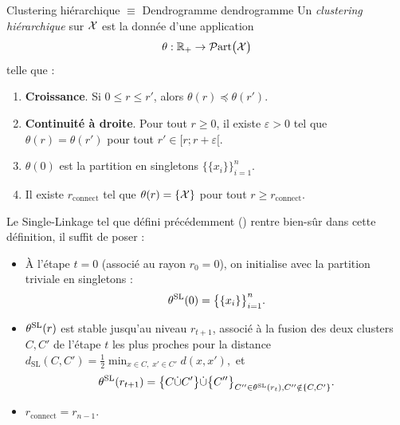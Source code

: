 \begin{Definition}{Clustering hiérarchique $\equiv$ Dendrogramme \cite{CarlssonMemoli2010}}{dendrogramme}
Un \emph{clustering hiérarchique} sur $\mathcal{X}$ est la donnée d'une application
$$\theta : \mathbb{R}_{+} \to \mathcal{P}\mathrm{art}\bigl( \mathcal{X} \bigr)$$
telle que :
\begin{enumerate}[label=(\roman*)]
    \item \textbf{Croissance}. Si $0\le r\le r'$, alors $\theta(r)\preceq \theta(r')$.
    \item \textbf{Continuité à droite}. Pour tout $r\ge0$, il existe $\varepsilon>0$ tel que
    $\theta(r)=\theta(r')$ pour tout $r'\in[r ; r+\varepsilon[$.
    \item $\theta(0)$ est la partition en singletons $\bigl\{\{x_i\}\bigr\}_{i=1}^n$.
    \item Il existe $r_{\mathrm{connect}}$ tel que $\theta(r)=\{\mathcal{X}\}$ pour tout $r\ge r_{\mathrm{connect}}$.
\end{enumerate}
\end{Definition}

Le Single-Linkage tel que défini précédemment () rentre bien-sûr dans cette définition, il suffit de poser :
\begin{itemize}
    \item À l'étape $t=0$ (associé au rayon $r_0 = 0$), on initialise avec la partition triviale en singletons :
    \[
        \theta^{\mathrm{SL}}(0) = \bigl\{\{x_i\}\bigr\}_{i=1}^{n}.
    \]
    \item  $\theta^{\mathrm{SL}}(r)$ est stable jusqu'au niveau $r_{t+1}$, associé à la fusion des deux clusters $C,C'$ de l'étape $t$ les plus proches pour la distance
$
    d_{\mathrm{SL}}(C,C')=\frac12\min_{x\in C,\;x'\in C'}d(x,x'),
$ et 
\[
    \theta^{\mathrm{SL}}(r_{t+1}) = \bigl\{C \dot\cup C' \bigr\} \dot\cup \bigl\{C'' \bigr\}_{C'' \in \theta^{\mathrm{SL}}(r_t), C'' \notin \{C,C'\}}.
\]
    \item $r_{\mathrm{connect}} = r_{n-1}.$
\end{itemize}


